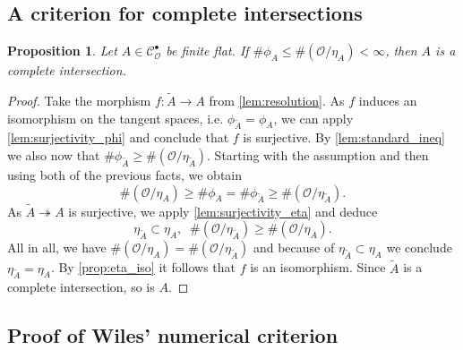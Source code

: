 \documentclass{article}
\theoremstyle{plain}%
\newtheorem{proposition}[theorem]{Proposition}
\theoremstyle{definition}
\theoremstyle{remark}
\newcommand{\cob}{\mathcal{C}_\mathcal{O}^\bullet}
\begin{document}
\subsection{A criterion for complete intersections}

\begin{proposition}\cite[theorem 5.27]{Darmon1995}\label{prop:criterionCI}
    Let \(A \in \cob\) be finite flat. If \(\# \phi_A \leq \#(\mathcal{O}/\eta_A) < \infty\), 
    then \(A\) is a complete intersection.
\end{proposition}
\begin{proof}
    Take the morphism \(f\colon \tilde{A} \to A\) from \cref{lem:resolution}.
    As \(f\) induces an isomorphism on the tangent spaces, i.e. \(\phi_{\tilde{A}} = \phi_A\), 
    we can apply \cref{lem:surjectivity_phi} and conclude that \(f\) is surjective.
    By \cref{lem:standard_ineq} we also now that \(\#\phi_{\tilde{A}} \geq \#(\mathcal{O}/\eta_{\tilde{A}})\).
    Starting with the assumption and then using both of the previous facts, we obtain
    \[
        \#(\mathcal{O}/\eta_A) \geq \#\phi_A = \#\phi_{\tilde{A}} \geq \#(\mathcal{O}/\eta_{\tilde{A}}).
    \]
    As \(\tilde{A} \twoheadrightarrow A\) is surjective, we apply \cref{lem:surjectivity_eta} 
    and deduce 
    \[
        \eta_{\tilde{A}} \subset \eta_A, \;\; \#(\mathcal{O}/\eta_{\tilde{A}}) \geq \#(\mathcal{O}/\eta_A).
    \]
    All in all, we have \(\#(\mathcal{O}/\eta_A) = \#(\mathcal{O}/\eta_{\tilde{A}})\) and because of
    \(\eta_{\tilde{A}} \subset \eta_A\) we conclude \(\eta_{\tilde{A}} = \eta_A\).
    By \cref{prop:eta_iso} it follows that \(f\) is an isomorphism.
    Since \(\tilde{A}\) is a complete intersection, so is \(A\).
\end{proof}

\subsection{Proof of Wiles' numerical criterion}
\end{document}
